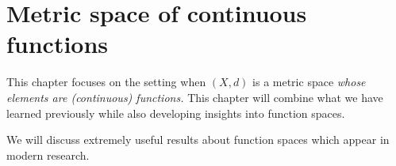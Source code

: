 \documentclass[12pt]{book}
\newcommand{\R}{\mathbb{R}}
\theoremstyle{remark}
\theoremstyle{definition}
\newtheorem{ex}{Exercise}[section]
\begin{document}
	\chapter{Metric space of continuous functions}
	\label{ch:C^zero}
	This chapter focuses on the setting when $(X,d)$ is a metric space \textit{whose elements are (continuous) functions.} This chapter will combine what we have learned previously while also developing insights into function spaces. 
	
	We will discuss extremely useful results about function spaces which appear in modern research.
%	
%	
%	
\end{document}
